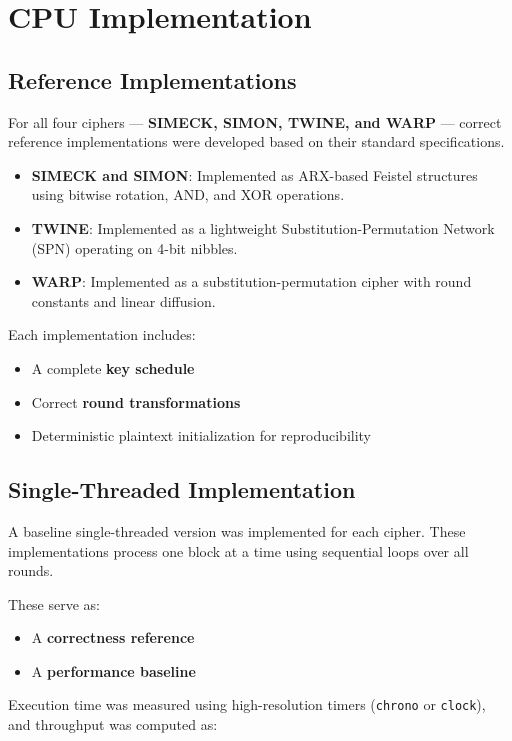 \section{CPU Implementation}

\subsection{Reference Implementations}

For all four ciphers --- \textbf{SIMECK, SIMON, TWINE, and WARP} --- correct reference implementations were developed based on their standard specifications.

\begin{itemize}
    \item \textbf{SIMECK and SIMON}: Implemented as ARX-based Feistel structures using bitwise rotation, AND, and XOR operations.
    \item \textbf{TWINE}: Implemented as a lightweight Substitution-Permutation Network (SPN) operating on 4-bit nibbles.
    \item \textbf{WARP}: Implemented as a substitution-permutation cipher with round constants and linear diffusion.
\end{itemize}

Each implementation includes:
\begin{itemize}
    \item A complete \textbf{key schedule}
    \item Correct \textbf{round transformations}
    \item Deterministic plaintext initialization for reproducibility
\end{itemize}

\subsection{Single-Threaded Implementation}

A baseline single-threaded version was implemented for each cipher. These implementations process one block at a time using sequential loops over all rounds.

These serve as:
\begin{itemize}
    \item A \textbf{correctness reference}
    \item A \textbf{performance baseline}
\end{itemize}

Execution time was measured using high-resolution timers (\texttt{chrono} or \texttt{clock}), and throughput was computed as:


